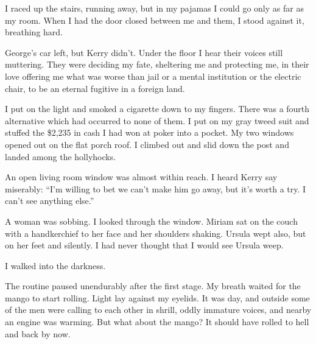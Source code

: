 \documentclass{novel}
\begin{document}
I raced up the stairs, running away, but in my pajamas I could go only as far as my room. When I had the door closed between me and them, I stood against it, breathing hard.

George’s car left, but Kerry didn’t. Under the floor I hear their voices still muttering. They were deciding my fate, sheltering me and protecting me, in their love offering me what was worse than jail or a mental institution or the electric chair, to be an eternal fugitive in a foreign land.

I put on the light and smoked a cigarette down to my fingers. There was a fourth alternative which had occurred to none of them. I put on my gray tweed suit and stuffed the \$2,235 in cash I had won at poker into a pocket. My two windows opened out on the flat porch roof. I climbed out and slid down the post and landed among the hollyhocks.

An open living room window was almost within reach. I heard Kerry say miserably: “I’m willing to bet we can’t make him go away, but it’s worth a try. I can’t see anything else.”

A woman was sobbing. I looked through the window. Miriam sat on the couch with a handkerchief to her face and her shoulders shaking. Ursula wept also, but on her feet and silently. I had never thought that I would see Ursula weep.

I walked into the darkness.

\vspace{2\nbs}
\clearpage
\thispagestyle{empty}
\begin{ChapterStart}
\vspace{3\nbs}
\end{ChapterStart}

The routine paused unendurably after the first stage. My breath waited for the mango to start rolling. Light lay against my eyelids. It was day, and outside some of the men were calling to each other in shrill, oddly immature voices, and nearby an engine was warming. But what about the mango? It should have rolled to hell and back by now.
\end{document}
